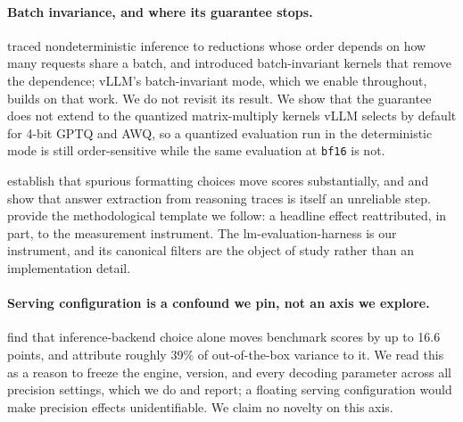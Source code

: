 \documentclass[conference]{IEEEtran}
\begin{document}
\paragraph{Batch invariance, and where its guarantee stops.}
\citet{he2025nondeterminism} traced nondeterministic inference to reductions whose order
depends on how many requests share a batch, and introduced batch-invariant kernels that
remove the dependence; vLLM's batch-invariant mode, which we enable throughout, builds on
that work. We do not revisit its result. We show that the guarantee does not extend to the
quantized matrix-multiply kernels vLLM selects by default for 4-bit GPTQ and AWQ, so a
quantized evaluation run in the deterministic mode is still order-sensitive while the
same evaluation at \texttt{bf16} is not.

\citet{sclar2024formatspread} establish that spurious formatting choices move
scores substantially, and \citet{jo2025finding} and \citet{yu2025xfinder} show
that answer extraction from reasoning traces is itself an unreliable step.
\citet{schaeffer2023mirage} provide the methodological template we follow: a
headline effect reattributed, in part, to the measurement instrument.
The lm-evaluation-harness \citep{biderman2024lessons} is our instrument, and its
canonical filters are the object of study rather than an implementation detail.

\paragraph{Serving configuration is a confound we pin, not an axis we explore.}
\citet{pape2026silent} find that inference-backend choice alone moves benchmark
scores by up to 16.6 points, and \citet{masoudian2026sideeffect} attribute
roughly 39\% of out-of-the-box variance to it. We read this as a reason to
freeze the engine, version, and every decoding parameter across all precision
settings, which
we do and report; a floating serving configuration would make precision effects
unidentifiable. We claim no novelty on this axis.
\end{document}
